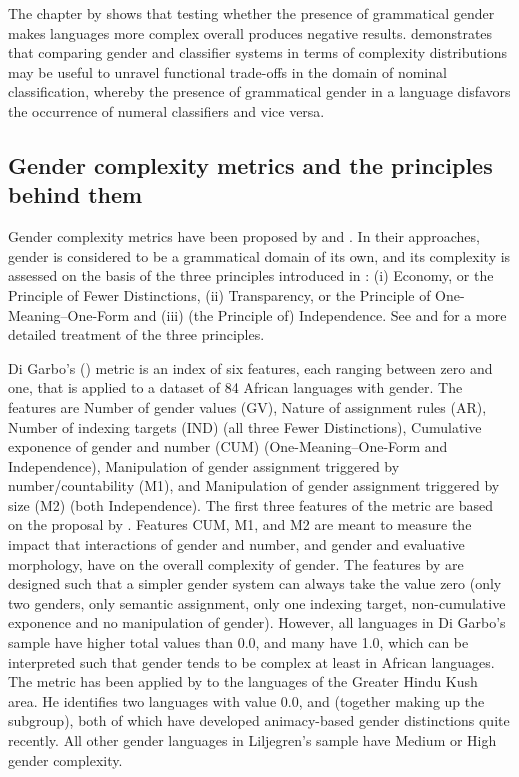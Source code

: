 \documentclass[output=collectionpaper]{langsci/langscibook}
\begin{document}
The chapter by  shows that testing whether the presence of grammatical gender makes languages more complex overall produces negative results.  demonstrates that comparing gender and classifier systems in terms of complexity distributions may be useful to unravel functional trade-offs in the domain of nominal classification, whereby the presence of grammatical gender in a language disfavors the occurrence of numeral classifiers and vice versa.


  \subsection{Gender complexity metrics and the principles behind them}
  \label{sec:WDG:2.2}

Gender complexity metrics have been proposed by \cite{Audring2014,Audring2017} and \cite{DiGarbo2014,DiGarbo2016}. In their approaches, gender is considered to be a grammatical domain of its own, and its complexity is assessed on the basis of the three principles introduced in : (i) Economy, or the Principle of Fewer Distinctions, (ii) Transparency, or the Principle of One-Meaning--One-Form and (iii) (the Principle of) Independence. See  and  for a more detailed treatment of the three principles.

Di Garbo's (\citeyear{DiGarbo2014,DiGarbo2016}) metric is an index of six features, each ranging between zero and one, that is applied to a dataset of 84 African languages with gender. The features are Number of gender values (GV), Nature of assignment rules (AR), Number of indexing targets (IND) (all three Fewer Distinctions), Cumulative exponence of gender and number (CUM) (One-Meaning--One-Form and Independence), Manipulation of gender assignment triggered by number/countability (M1), and Manipulation of gender assignment triggered by size (M2) (both Independence). The first three features of the metric are based on the proposal by \cite{Audring2014}. Features CUM, M1, and M2 are meant to measure the impact that interactions of gender and number, and gender and evaluative morphology, have on the overall complexity of gender. The features by \cite{DiGarbo2014,DiGarbo2016} are designed such that a simpler gender system can always take the value zero (only two genders, only semantic assignment, only one indexing target, non-cumulative exponence and no manipulation of gender). However, all languages in Di Garbo's sample have higher total values than 0.0, and many have 1.0, which can be interpreted such that gender tends to be complex at least in African languages. The metric has been applied by  to the languages of the Greater Hindu Kush area. He identifies two languages with value 0.0,  and  (together making up the  subgroup), both of which have developed animacy-based gender distinctions quite recently. All other gender languages in Liljegren's sample have Medium or High gender complexity.
\end{document}
